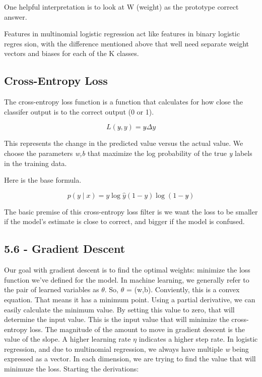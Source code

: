 \documentclass{article}
\begin{document}
One helpful interpretation is to look at W (weight) as the prototype correct answer.

Features in multinomial logistic regression act like features in binary logistic regres
sion, with the difference mentioned above that well need separate weight vectors
and biases for each of the K classes.

\subsection{Cross-Entropy Loss}

The cross-entropy loss function is a function that calculates for how close the classifer output is to the correct output (0 or 1).

\[
    L(y\hat{}, y) = y\hat{} \Delta y
\]

This represents the change in the predicted value versus the actual value. We choose the parameters \textit{w,b} that maximize the log probability of the true \textit{y} labels in the training data.

Here is the base formula.

\[
    p(y \mid x) = y \log \hat{y} (1-y)\log(1-y\hat{})
\]

The basic premise of this cross-entropy loss filter is we
want the loss to be smaller if the model’s estimate is close to correct, and bigger if
the model is confused.

\subsection{5.6 - Gradient Descent}

Our goal with gradient descent is to find the optimal weights: minimize the loss
function we’ve defined for the model. In machine learning, we generally refer to the pair of
learned variables as $\theta$. So, $\theta$ = (w,b). Conviently, this is a convex equation. That means it has a minimum point.
Using a partial derivative, we can easily calculate the minimum value. By setting this value to zero, that will determine the input value. This
is the input value that will minimize the cross-entropy loss.
The magnitude of the amount to move in gradient descent is the value of the
slope. A higher learning rate $\eta$ indicates a higher step rate. In logistic regression, and due to
multinomial regression, we always have multiple \textit{w} being expressed as a vector.
In each dimension, we are trying to find the value that will minimuze the loss. Starting the derivations:
\end{document}
